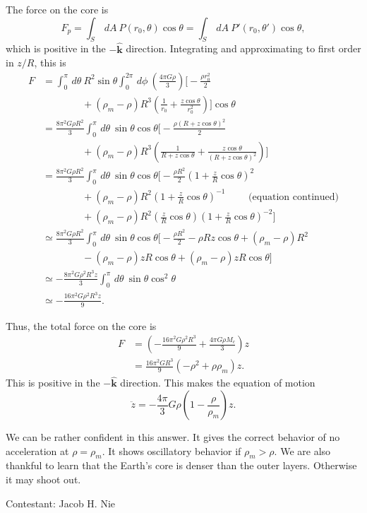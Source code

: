 \documentclass[12pt]{article}
\newcommand{\diff}{\,\textit{d}}
\begin{document}
The force on the core is 
 \[
	 F_p = \int_S \diff A \ P(r_0,\theta) \cos\theta = \int_S \diff A \ P'(r_0,\theta') \cos\theta,
\]
which is positive in the $-\hat{\mathbf{k}}$ direction.  Integrating and approximating to first order in $z/R$, this is
\begingroup
\allowdisplaybreaks
\begin{align*}
	F &= \int_0^{\pi} \diff \theta \ R^2 \sin\theta \int_0^{2\pi} \diff \phi \ \left( \frac{4\pi G \rho}{3} \right) \bigg[ -\frac{\rho r_0^2}{2} \\
	  & \qquad \qquad + (\rho_m - \rho) R^3\left( \frac{1}{r_0} + \frac{z\cos \theta}{r_0^2} \right) \bigg] \cos \theta  \\
	  &= \frac{8\pi^2 G \rho R^2}{3} \int_0^{\pi} \diff \theta \ \sin\theta \cos\theta \bigg [ -\frac{\rho (R+z\cos\theta)^2}{2} \\
	  & \qquad \qquad + (\rho_m - \rho) R^3 \left( \frac{1}{R+z\cos\theta} + \frac{z\cos\theta}{(R+z\cos\theta)^2} \right) \bigg]\\
	  &= \frac{8\pi^2 G \rho R^2}{3} \int_0 ^{\pi} \diff \theta \ \sin\theta \cos\theta \bigg [ -\frac{\rho R^2}{2}\left( 1 + \frac{z}{R}\cos\theta \right)^2 \\
	  & \qquad \qquad + (\rho_m - \rho)R^2 \left( 1 + \frac{z}{R}\cos\theta \right)^{-1} \qquad \text{ (equation continued)}\\
	  &\qquad \qquad + (\rho_m - \rho)R^2 \left( \frac{z}{R}\cos\theta \right)\left( 1 + \frac{z}{R}\cos\theta \right)^{-2}\bigg] \\
	  &\simeq \frac{8\pi^2 G\rho R^2}{3} \int_0^{\pi} \diff\theta \ \sin\theta \cos\theta \bigg[- \frac{\rho R^2}{2} - \rho Rz\cos\theta + (\rho_m - \rho)R^2 \\
	  & \qquad \qquad - (\rho_m -\rho)zR\cos\theta + (\rho_m - \rho)zR\cos\theta \bigg] \\
	  &\simeq -\frac{8\pi^2 G \rho^2 R^3 z}{3} \int_0^{\pi} \diff \theta \ \sin\theta \cos^2\theta \\
	  &\simeq -\frac{16\pi^2 G\rho^2 R^3 z}{9}.
\end{align*}
\endgroup

Thus, the total force on the core is 
\begin{align*}
	F &= \left( -\frac{16\pi^2 G \rho^2 R^3}{9} + \frac{4\pi G \rho M_c}{3} \right)z \\
	  &= \frac{16\pi^2 G R^3}{9}(-\rho^2 + \rho \rho_m)z.
\end{align*}
This is positive in the $-\hat{\mathbf{k}}$ direction.  This makes the equation of motion 
\[
	\ddot{z} = -\frac{4\pi}{3}G\rho \left( 1-\frac{\rho}{\rho_m} \right)z.
\]

We can be rather confident in this answer.  It gives the correct behavior of no acceleration at $\rho = \rho_m$. It shows oscillatory behavior if $\rho_m > \rho$.  We are also thankful to learn that the Earth's core is denser than the outer layers.  Otherwise it may shoot out.

\vspace{1cm}

\hfill Contestant: Jacob H. Nie
\end{document}

